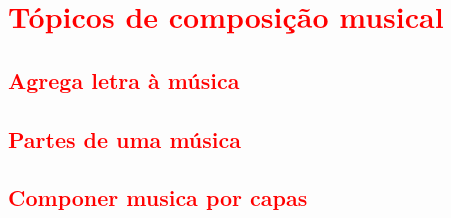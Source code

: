 

\chapter{\textcolor{red}{Tópicos de composição musical}}


\section{\textcolor{red}{Agrega letra à música}}

\cite[pp. 149]{medteoria}


\section{\textcolor{red}{Partes de uma música}}

\section{\textcolor{red}{Componer musica por capas}}


